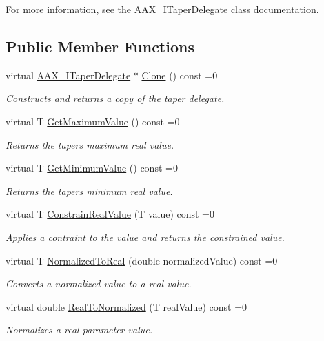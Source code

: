 For more information, see the \hyperlink{a00114}{A\+A\+X\+\_\+\+I\+Taper\+Delegate} class documentation. \subsection*{Public Member Functions}
\begin{DoxyCompactItemize}
\item 
virtual \hyperlink{a00114}{A\+A\+X\+\_\+\+I\+Taper\+Delegate} $\ast$ \hyperlink{a00114_a80ce054ca716147155fe0682adf4e469}{Clone} () const =0
\begin{DoxyCompactList}\small\item\em Constructs and returns a copy of the taper delegate. \end{DoxyCompactList}\item 
virtual T \hyperlink{a00114_a9b14f7d73d614b6c012ed03fadb9f0eb}{Get\+Maximum\+Value} () const =0
\begin{DoxyCompactList}\small\item\em Returns the taper\textquotesingle{}s maximum real value. \end{DoxyCompactList}\item 
virtual T \hyperlink{a00114_ac51bda25adc6f4ce320c0dd41fa332c7}{Get\+Minimum\+Value} () const =0
\begin{DoxyCompactList}\small\item\em Returns the taper\textquotesingle{}s minimum real value. \end{DoxyCompactList}\item 
virtual T \hyperlink{a00114_a1de7acdc2b3e114b6686bf845c2465f1}{Constrain\+Real\+Value} (T value) const =0
\begin{DoxyCompactList}\small\item\em Applies a contraint to the value and returns the constrained value. \end{DoxyCompactList}\item 
virtual T \hyperlink{a00114_a0aea0765b42855205bfab84673a2de33}{Normalized\+To\+Real} (double normalized\+Value) const =0
\begin{DoxyCompactList}\small\item\em Converts a normalized value to a real value. \end{DoxyCompactList}\item 
virtual double \hyperlink{a00114_ab017fe7e1c1dcf6191f8b4e8b09f8add}{Real\+To\+Normalized} (T real\+Value) const =0
\begin{DoxyCompactList}\small\item\em Normalizes a real parameter value. \end{DoxyCompactList}\end{DoxyCompactItemize}


